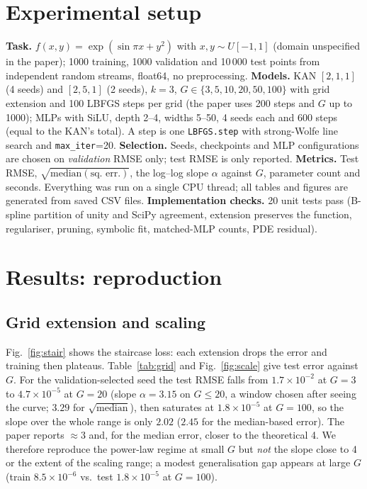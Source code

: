 \section{Experimental setup}
\textbf{Task.} $f(x,y)=\exp(\sin\pi x+y^2)$ with $x,y\sim U[-1,1]$ (domain unspecified in the paper); 1000 training, 1000 validation and 10\,000 test points from independent random streams, float64, no preprocessing. \textbf{Models.} KAN $[2,1,1]$ (4 seeds) and $[2,5,1]$ (2 seeds), $k{=}3$, $G\in\{3,5,10,20,50,100\}$ with grid extension and 100 LBFGS steps per grid (the paper uses 200 steps and $G$ up to 1000); MLPs with SiLU, depth 2--4, widths 5--50, 4 seeds each and 600 steps (equal to the KAN's total). A step is one \texttt{LBFGS.step} with strong-Wolfe line search and \texttt{max\_iter}=20. \textbf{Selection.} Seeds, checkpoints and MLP configurations are chosen on \emph{validation} RMSE only; test RMSE is only reported. \textbf{Metrics.} Test RMSE, $\sqrt{\mathrm{median}(\text{sq.\ err.})}$, the log--log slope $\alpha$ against $G$, parameter count and seconds. Everything was run on a single CPU thread; all tables and figures are generated from saved CSV files. \textbf{Implementation checks.} 20 unit tests pass (B-spline partition of unity and SciPy agreement, extension preserves the function, regulariser, pruning, symbolic fit, matched-MLP counts, PDE residual).

\section{Results: reproduction}
\subsection{Grid extension and scaling}
Fig.~\ref{fig:stair} shows the staircase loss: each extension drops the error and training then plateaus. Table~\ref{tab:grid} and Fig.~\ref{fig:scale} give test error against $G$. For the validation-selected seed the test RMSE falls from $1.7\times10^{-2}$ at $G{=}3$ to $4.7\times10^{-5}$ at $G{=}20$ (slope $\alpha=3.15$ on $G\le20$, a window chosen after seeing the curve; $3.29$ for $\sqrt{\mathrm{median}}$), then saturates at $1.8\times10^{-5}$ at $G{=}100$, so the slope over the whole range is only $2.02$ ($2.45$ for the median-based error). The paper reports $\approx3$ and, for the median error, closer to the theoretical 4. We therefore reproduce the power-law regime at small $G$ but \emph{not} the slope close to 4 or the extent of the scaling range; a modest generalisation gap appears at large $G$ (train $8.5\times10^{-6}$ vs.\ test $1.8\times10^{-5}$ at $G{=}100$).

